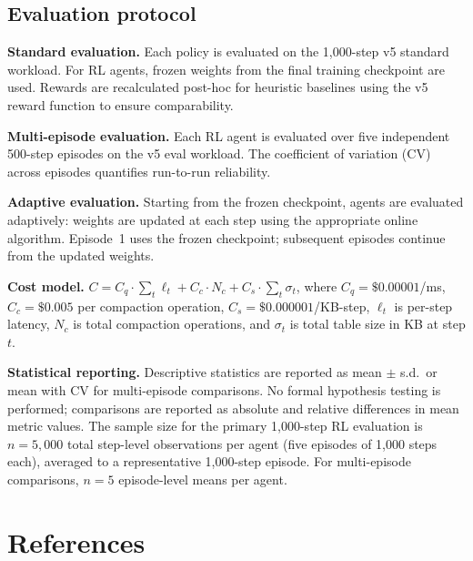 \documentclass[fleqn,10pt]{wlscirep}
\begin{document}
\FloatBarrier

\subsection*{Evaluation protocol}

\textbf{Standard evaluation.}
Each policy is evaluated on the 1,000-step v5 standard workload.
For RL agents, frozen weights from the final training checkpoint are
used. Rewards are recalculated post-hoc for heuristic baselines using
the v5 reward function to ensure comparability.

\textbf{Multi-episode evaluation.}
Each RL agent is evaluated over five independent 500-step episodes on
the v5 eval workload. The coefficient of variation (CV) across episodes
quantifies run-to-run reliability.

\textbf{Adaptive evaluation.}
Starting from the frozen checkpoint, agents are evaluated adaptively:
weights are updated at each step using the appropriate online algorithm.
Episode~1 uses the frozen checkpoint; subsequent episodes continue from
the updated weights.

\textbf{Cost model.}
$C = C_q \cdot \sum_t \ell_t + C_c \cdot N_c + C_s \cdot \sum_t
\sigma_t$, where $C_q = \$0.00001$/ms, $C_c = \$0.005$ per compaction
operation, $C_s = \$0.000001$/KB-step, $\ell_t$ is per-step latency,
$N_c$ is total compaction operations, and $\sigma_t$ is total table
size in KB at step $t$.

\textbf{Statistical reporting.}
Descriptive statistics are reported as mean $\pm$ s.d.\ or mean with CV
for multi-episode comparisons. No formal hypothesis testing is performed;
comparisons are reported as absolute and relative differences in mean
metric values. The sample size for the primary 1,000-step RL evaluation is
$n = 5{,}000$ total step-level observations per agent (five episodes
of 1,000 steps each), averaged to a representative 1,000-step episode.
For multi-episode comparisons, $n = 5$ episode-level means per agent.

\FloatBarrier

\section*{References}
\end{document}
